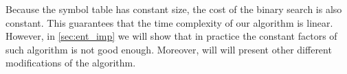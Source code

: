 Because the symbol table has constant size, the cost of the binary search is also constant.
This guarantees that the time complexity of our algorithm is linear. However, in \ref{sec:ent_imp} we will show that in practice the 
constant factors of such algorithm is not good enough. Moreover, will will present other different modifications
of the algorithm.
